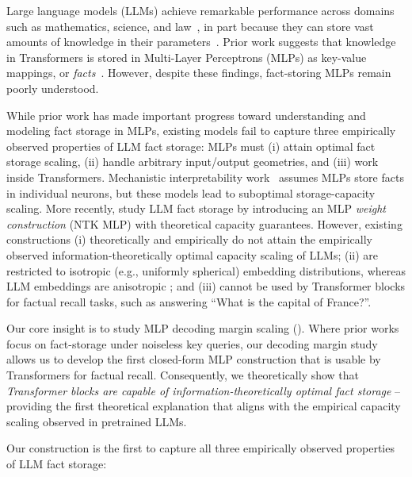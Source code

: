 Large language models (LLMs) achieve remarkable performance across domains such as mathematics, science, and law~\citep{AlphaProof2024_DMind,guha2023legalbench,saab2024capabilities}, in part because they can store vast amounts of knowledge in their parameters~\citep{petroni2019language,meng2023locatingeditingfactualassociations}.
Prior work suggests that knowledge in Transformers is stored in Multi-Layer Perceptrons (MLPs) as key-value mappings, or \emph{facts}~\citep{geva2021transformerfeedforwardlayerskeyvalue,dai2022knowledgeneuronspretrainedtransformers}.
However, despite these findings, fact-storing MLPs remain poorly understood.

While prior work has made important progress toward understanding and modeling fact storage in MLPs, existing models fail to capture three empirically observed properties of LLM fact storage: MLPs must (i) attain optimal fact storage scaling, (ii) handle arbitrary input/output geometries, and (iii) work inside Transformers.
Mechanistic interpretability work~\citep{geva2021transformerfeedforwardlayerskeyvalue,dai2022knowledgeneuronspretrainedtransformers} assumes MLPs store facts in individual neurons, but these models lead to suboptimal storage-capacity scaling.
More recently, \citet{nichani2024understandingfactualrecalltransformers} study LLM fact storage by introducing an MLP \emph{weight construction} (NTK MLP) with theoretical capacity guarantees.
However, existing constructions
(i) theoretically and empirically do not attain the empirically observed information-theoretically optimal capacity scaling of LLMs;
(ii) are restricted to isotropic (e.g., uniformly spherical) embedding distributions, whereas LLM embeddings are anisotropic \citep{ethayarajh2019contextualcontextualizedwordrepresentations,razzhigaev2024shapelearninganisotropyintrinsic}; and 
(iii) cannot be used by Transformer blocks for factual recall tasks, such as answering ``What is the capital of France?''.

Our core insight is to study MLP decoding margin scaling (). Where prior works focus on fact-storage under noiseless key queries, our decoding margin study allows us to develop the first closed-form MLP construction that is usable by Transformers for factual recall. Consequently, we theoretically show that \emph{Transformer blocks are capable of information-theoretically optimal fact storage} -- providing the first theoretical explanation that aligns with the empirical capacity scaling observed in pretrained LLMs.

Our construction is the first to capture all three empirically observed properties of LLM fact storage:




